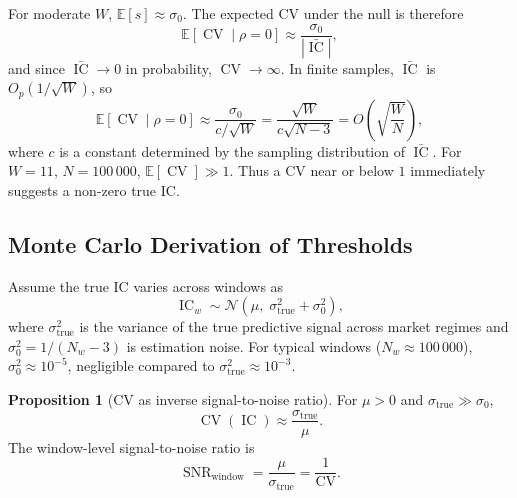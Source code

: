 \documentclass[11pt,a4paper]{article}
\theoremstyle{definition}
\newtheorem{proposition}{Proposition}[section]
\newcommand{\IC}{\operatorname{IC}}
\newcommand{\E}{\mathbb{E}}
\newcommand{\CV}{\operatorname{CV}}
\newcommand{\N}{\mathcal{N}}
\newcommand{\SNR}{\operatorname{SNR}}
\begin{document}
For moderate $W$, $\E[s] \approx \sigma_0$.  The expected CV under the null
is therefore
\begin{equation}
    \E[\CV \mid \rho=0] \approx \frac{\sigma_0}{|\bar{\IC}|},
\end{equation}
and since $\bar{\IC} \to 0$ in probability, $\CV \to \infty$.
In finite samples, $\bar{\IC}$ is $O_p(1/\sqrt{W})$, so
\begin{equation}
    \E[\CV \mid \rho=0] \approx \frac{\sigma_0}{c/\sqrt{W}}
                          = \frac{\sqrt{W}}{c\sqrt{N-3}}
                          = O\!\left(\sqrt{\frac{W}{N}}\right),
\end{equation}
where $c$ is a constant determined by the sampling distribution of
$\bar{\IC}$.  For $W=11$, $N=100\,000$, $\E[\CV] \gg 1$.
Thus a CV near or below $1$ immediately suggests a non-zero true IC.

\subsection{Monte Carlo Derivation of Thresholds}

Assume the true IC varies across windows as
\begin{equation}
    \IC_w \sim \N(\mu,\;\sigma_{\text{true}}^2 + \sigma_0^2),
\end{equation}
where $\sigma_{\text{true}}^2$ is the variance of the true predictive
signal across market regimes and $\sigma_0^2 = 1/(N_w-3)$ is estimation
noise.  For typical windows ($N_w \approx 100\,000$), $\sigma_0^2 \approx
10^{-5}$, negligible compared to $\sigma_{\text{true}}^2 \approx 10^{-3}$.

\begin{proposition}[CV as inverse signal-to-noise ratio]
    For $\mu > 0$ and $\sigma_{\text{true}} \gg \sigma_0$,
    \begin{equation}
        \CV(\IC) \approx \frac{\sigma_{\text{true}}}{\mu}.
        \label{eq:cv_snr}
    \end{equation}
    The window-level signal-to-noise ratio is
    \begin{equation}
        \SNR_{\text{window}} = \frac{\mu}{\sigma_{\text{true}}}
                             = \frac{1}{\CV}.
    \end{equation}
\end{proposition}
\end{document}
